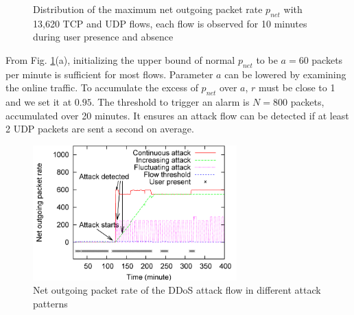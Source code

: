 \begin{figure}[htb]
\centering {}
\caption{Distribution of the maximum net outgoing
packet rate $p_{net}$ with 13,620 TCP and UDP flows, each flow is
observed for 10 minutes during user presence and absence}
\label{fig:ddos}
\end{figure}

From Fig. \ref{fig:ddos}(a), initializing the upper bound of normal
$p_{net}$ to be $a=60$ packets per minute is sufficient for most
flows. Parameter $a$ can be lowered by examining the online traffic. To
accumulate the excess of $p_{net}$ over $a$, $r$ must be close to 1
and we set it at $0.95$. The threshold to trigger an alarm is
$N=800$ packets, accumulated over 20 minutes. It ensures an attack
flow can be detected if at least 2 UDP packets are sent a second on
average.

\begin{figure}[htb]
\centering
\includegraphics[width=0.7\textwidth]{sensor/ddos-atkflow.png}
\caption{Net outgoing packet rate of the DDoS attack flow in
different attack patterns}
\label{fig:ddos-atkflow}
\end{figure}

